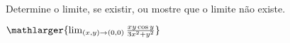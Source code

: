 Determine o limite, se existir, ou mostre que o limite não existe.

\item$\mathlarger{\lim_{(x,y)\rightarrow(0,0)} \frac{xy\cos y}{3x^2 + y^2}}$
